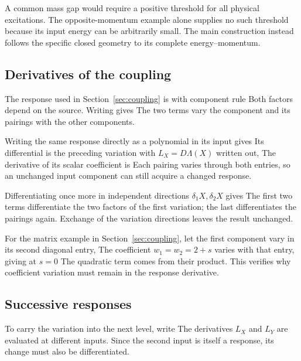 A common mass gap would require a positive threshold for all physical excitations. The opposite-momentum example alone supplies no such threshold because its input energy can be arbitrarily small. The main construction instead follows the specific closed geometry to its complete energy--momentum.

\subsection{Derivatives of the coupling}
The response used in Section~\ref{sec:coupling} is
\FieldCouplingResponseDisplay
with component rule
\FieldCouplingWeightsDisplay
Both factors depend on the source. Writing
\FieldCouplingDerivativeDisplay
gives
\FieldCouplingVariationDisplay
The two terms vary the component and its pairings with the other components.

Writing the same response directly as a polynomial in its input gives
\CouplingMapPolynomialCouplingDisplay
Its differential is the preceding variation with $L_X=D\Lambda(X)$ written out,
\CouplingMapCouplingDifferentialDisplay
The derivative of its scalar coefficient is
\DifferentiationCoefficientDisplay
Each pairing varies through both entries, so an unchanged input component can still acquire a changed response.

Differentiating once more in independent directions $\delta_1X,\delta_2X$ gives
\CouplingMapCouplingSecondDifferentialDisplay
The first two terms differentiate the two factors of the first variation; the last differentiates the pairings again. Exchange of the variation directions leaves the result unchanged.

For the matrix example in Section~\ref{sec:coupling}, let the first component vary in its second diagonal entry,
\DifferentiationMatrixCurveDisplay
The coefficient $w_1=w_2=2+s$ varies with that entry, giving at $s=0$
\DifferentiationMatrixDerivativesDisplay
The quadratic term comes from their product. This verifies why coefficient variation must remain in the response derivative.

\subsection{Successive responses}
To carry the variation into the next level, write
\DifferentiationChainDefinitionDisplay
The derivatives $L_X$ and $L_Y$ are evaluated at different inputs. Since the second input is itself a response, its change must also be differentiated.

